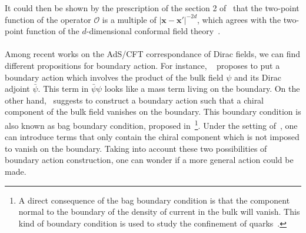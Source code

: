 It could then be shown by the prescription of the section 2 of~\cite{Skenderis2002} that the two-point function of the operator $\mathcal{O}$ is a multiple of $|\mathbf{x} - \mathbf{x}'|^{-2d}$, which agrees with the two-point function of the $d$-dimensional conformal field theory~\cite{Qualls2015}. \\\\
%
Among recent works on the AdS/CFT correspondance of Dirac fields, we can find different propositions for boundary action.
For instance, 
~\cite{Henningson1998} proposes to put a boundary action which involves the product of the bulk field $\psi$ and its Dirac adjoint $\bar{\psi}$. 
This term in $\bar{\psi}\psi$ looks like a mass term living on the boundary.
On the other hand,~\cite{Contino2005} suggests to construct a boundary action such that a chiral component of the bulk field vanishes on the boundary.
This boundary condition is also known as bag boundary condition, proposed in~\cite{Chodos1974}\footnote{
A direct consequence of the bag boundary condition is that the component normal to the boundary of the density of current in the bulk will vanish. 
This kind of boundary condition is used to study the confinement of quarks~\cite{Hasenfratz1978}.
}.
Under the setting of~\cite{Contino2005}, one can introduce terms that only contain the chiral component which is not imposed to vanish on the boundary.
Taking into account these two possibilities of boundary action construction, 
one can wonder if a more general action could be made. 
%
%
%












